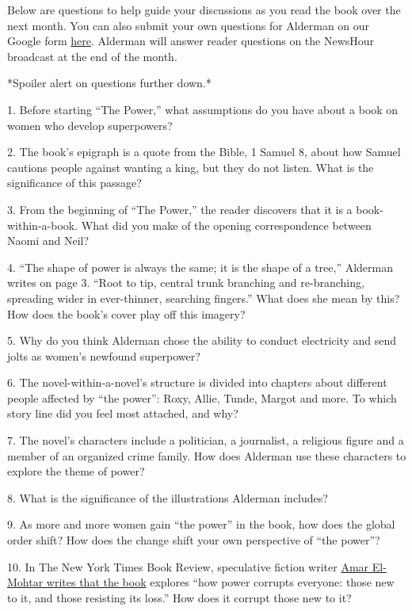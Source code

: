 Below are questions to help guide your discussions as you read the book
over the next month. You can also submit your own questions for Alderman
on our Google form
\href{https://docs.google.com/forms/d/1wvnZN26lVv-s8WqvRdJdMZRKQrFRBRJo-Ixpz0Wvn38/edit}{here}.
Alderman will answer reader questions on the NewsHour broadcast at the
end of the month.

*Spoiler alert on questions further down.*

1. Before starting ``The Power,'' what assumptions do you have about a
book on women who develop superpowers?

2. The book's epigraph is a quote from the Bible, 1 Samuel 8, about how
Samuel cautions people against wanting a king, but they do not listen.
What is the significance of this passage?

3. From the beginning of ``The Power,'' the reader discovers that it is
a book-within-a-book. What did you make of the opening correspondence
between Naomi and Neil?

4. ``The shape of power is always the same; it is the shape of a tree,''
Alderman writes on page 3. ``Root to tip, central trunk branching and
re-branching, spreading wider in ever-thinner, searching fingers.'' What
does she mean by this? How does the book's cover play off this imagery?

5. Why do you think Alderman chose the ability to conduct electricity
and send jolts as women's newfound superpower?

6. The novel-within-a-novel's structure is divided into chapters about
different people affected by ``the power'': Roxy, Allie, Tunde, Margot
and more. To which story line did you feel most attached, and why?

7. The novel's characters include a politician, a journalist, a
religious figure and a member of an organized crime family. How does
Alderman use these characters to explore the theme of power?

8. What is the significance of the illustrations Alderman includes?

9. As more and more women gain ``the power'' in the book, how does the
global order shift? How does the change shift your own perspective of
``the power''?

10. In The New York Times Book Review, speculative fiction writer
\href{https://www.nytimes3xbfgragh.onion/2017/10/25/books/review/naomi-alderman-power.html?rref=collection\%2Fspotlightcollection\%2Fnow-read-this\&action=click\&contentCollection=books\&region=rank\&module=package\&version=highlights\&contentPlacement=2\&pgtype=collection}{Amar
El-Mohtar writes that the book} explores ``how power corrupts everyone:
those new to it, and those resisting its loss.'' How does it corrupt
those new to it?

